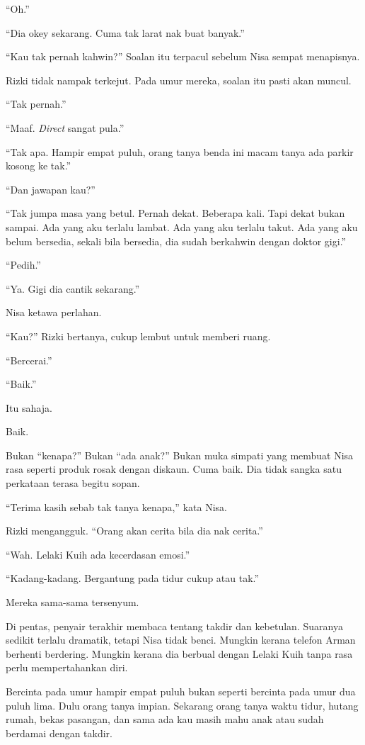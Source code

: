\documentclass[
  11pt,
  a5paper,
  openany,
  oneside]{book}
\begin{document}
``Oh.''

``Dia okey sekarang. Cuma tak larat nak buat banyak.''

``Kau tak pernah kahwin?'' Soalan itu terpacul sebelum Nisa sempat
menapisnya.

Rizki tidak nampak terkejut. Pada umur mereka, soalan itu pasti akan
muncul.

``Tak pernah.''

``Maaf. \emph{Direct} sangat pula.''

``Tak apa. Hampir empat puluh, orang tanya benda ini macam tanya ada
parkir kosong ke tak.''

``Dan jawapan kau?''

``Tak jumpa masa yang betul. Pernah dekat. Beberapa kali. Tapi dekat
bukan sampai. Ada yang aku terlalu lambat. Ada yang aku terlalu takut.
Ada yang aku belum bersedia, sekali bila bersedia, dia sudah berkahwin
dengan doktor gigi.''

``Pedih.''

``Ya. Gigi dia cantik sekarang.''

Nisa ketawa perlahan.

``Kau?'' Rizki bertanya, cukup lembut untuk memberi ruang.

``Bercerai.''

``Baik.''

Itu sahaja.

Baik.

Bukan ``kenapa?'' Bukan ``ada anak?'' Bukan muka simpati yang membuat
Nisa rasa seperti produk rosak dengan diskaun. Cuma baik. Dia tidak
sangka satu perkataan terasa begitu sopan.

``Terima kasih sebab tak tanya kenapa,'' kata Nisa.

Rizki mengangguk. ``Orang akan cerita bila dia nak cerita.''

``Wah. Lelaki Kuih ada kecerdasan emosi.''

``Kadang-kadang. Bergantung pada tidur cukup atau tak.''

Mereka sama-sama tersenyum.

Di pentas, penyair terakhir membaca tentang takdir dan kebetulan.
Suaranya sedikit terlalu dramatik, tetapi Nisa tidak benci. Mungkin
kerana telefon Arman berhenti berdering. Mungkin kerana dia berbual
dengan Lelaki Kuih tanpa rasa perlu mempertahankan diri.

Bercinta pada umur hampir empat puluh bukan seperti bercinta pada umur
dua puluh lima. Dulu orang tanya impian. Sekarang orang tanya waktu
tidur, hutang rumah, bekas pasangan, dan sama ada kau masih mahu anak
atau sudah berdamai dengan takdir.
\end{document}

